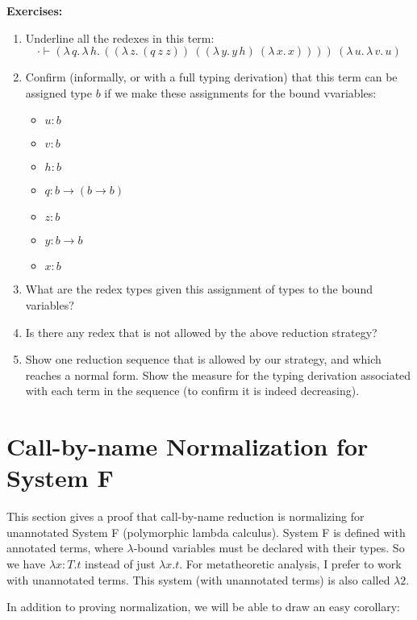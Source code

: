 \documentclass{article}
\begin{document}
\textbf{Exercises:} 
\begin{enumerate}
\item Underline all the redexes in this term:
  \[
  \cdot\vdash (\lambda\,q.\,\lambda\,h.\,((\lambda\, z.\,(q\ z\ z))\ ((\lambda\, y.\,y\, h)\ (\lambda\,x.\,x))))\ (\lambda\,u.\,\lambda\,v.\,u)
  \]
\item Confirm (informally, or with a full typing derivation) that this term can be assigned type $b$ if we make these assignments for the bound vvariables:
  \begin{itemize}
  \item $u : b$
  \item $v : b$    
  \item $h : b$
  \item $q : b \to (b \to b)$
  \item $z : b$
  \item $y : b \to b$
  \item $x : b$
  \end{itemize}

\item What are the redex types given this assignment of types to the bound variables?

\item Is there any redex that is not allowed by the above reduction strategy?

\item Show one reduction sequence that is allowed by our strategy, and which
  reaches a normal form.  Show the measure for the typing derivation associated
  with each term in the sequence (to confirm it is indeed decreasing).
\end{enumerate}

\section{Call-by-name Normalization for System F}

This section gives a proof that call-by-name reduction is normalizing
for unannotated System F (polymorphic lambda calculus).  System F is
defined with annotated terms, where $\lambda$-bound variables must be
declared with their types.  So we have $\lambda x:T.t$ instead of just
$\lambda x.t$.  For metatheoretic analysis, I prefer to work with
unannotated terms.  This system (with unannotated terms) is also
called $\lambda2$.

In addition to proving normalization, we will be able to draw an
easy corollary: 
\end{document}
